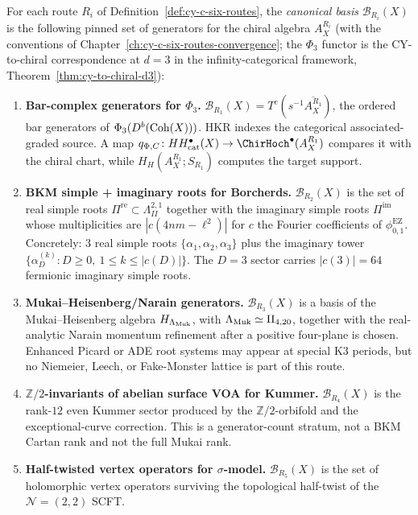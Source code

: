 \begin{definition}
\label{def:canonical-basis-per-route}
For each route $R_i$ of Definition~\ref{def:cy-c-six-routes}, the \emph{canonical basis} $\mathcal{B}_{R_i}(X)$
is the following pinned set of generators for the chiral algebra $A_X^{R_i}$ (with the conventions of
Chapter~\ref{ch:cy-c-six-routes-convergence}; the $\Phi_3$ functor is the CY-to-chiral correspondence at
$d=3$ in the infinity-categorical framework, Theorem~\ref{thm:cy-to-chiral-d3}):
\begin{enumerate}[label=\textbf{R\arabic*.}]
 \item \textbf{Bar-complex generators for $\Phi_3$.} $\mathcal{B}_{R_1}(X) = T^c(s^{-1} \overline{A_X^{R_1}})$,
 the ordered bar generators of $\Phi_3(D^b(\mathrm{Coh}(X)))$.  HKR indexes
 the categorical associated-graded source.  A map
 $q_{\Phi,C}\colon HH^\bullet_{\mathrm{cat}}(X)\to
 \ChirHoch^\bullet(A_X^{R_1})$ compares it with the chiral chart,
 while $H_H(A_X^{R_1};S_{R_1})$ computes the target support.
 \item \textbf{BKM simple + imaginary roots for Borcherds.} $\mathcal{B}_{R_2}(X)$ is the set of real simple
 roots $\Pi^{\mathrm{re}} \subset \Lambda^{2,1}_{II}$ together with the imaginary simple roots
 $\Pi^{\mathrm{im}}$ whose multiplicities are $|c(4nm - \ell^2)|$ for $c$ the Fourier coefficients of
 $\phi_{0, 1}^{\mathrm{EZ}}$. Concretely: $3$ real simple roots $\{\alpha_1, \alpha_2, \alpha_3\}$ plus the imaginary tower
 $\{\alpha_D^{(k)} : D \ge 0,\ 1 \le k \le |c(D)|\}$. The $D = 3$ sector carries $|c(3)| = 64$
 fermionic imaginary simple roots.
\item \textbf{Mukai--Heisenberg/Narain generators.} $\mathcal{B}_{R_3}(X)$ is a basis of the Mukai--Heisenberg algebra $H_{\Lambda_{\mathrm{Muk}}}$, with $\Lambda_{\mathrm{Muk}}\simeq \mathrm{II}_{4,20}$, together with the real-analytic Narain momentum refinement after a positive four-plane is chosen. Enhanced Picard or ADE root systems may appear at special K3 periods, but no Niemeier, Leech, or Fake-Monster lattice is part of this route.
\item \textbf{$\mathbb{Z}/2$-invariants of abelian surface VOA for Kummer.} $\mathcal{B}_{R_4}(X)$ is the
rank-$12$ even Kummer sector produced by the $\mathbb{Z}/2$-orbifold and the exceptional-curve correction. This is a generator-count stratum, not a BKM Cartan rank and not the full Mukai rank.
 \item \textbf{Half-twisted vertex operators for $\sigma$-model.} $\mathcal{B}_{R_5}(X)$ is the set of
 holomorphic vertex operators surviving the topological half-twist of the $\mathcal{N} = (2, 2)$ SCFT.

\end{enumerate}
\end{definition}
